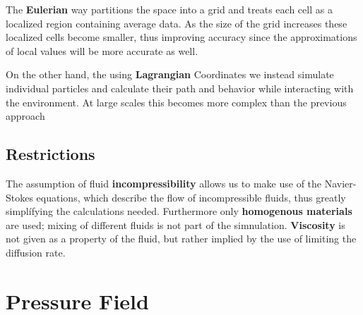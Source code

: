 \documentclass[12pt, titlepage]{article}
\begin{document}
\begin{figure}[b]
\centering
\begin{minipage}{.5\textwidth}
  \centering
  \label{fig:test1}
\end{minipage}%
\begin{minipage}{.5\textwidth}
  \centering
  \label{fig:test2}
\end{minipage}
\end{figure}


The \textbf{Eulerian} way partitions the space into a grid and treats each cell as a localized region containing average data. As the size of the grid increases these localized cells become smaller, thus improving accuracy since the approximations of local values will be more accurate as well.

On the other hand, the using \textbf{Lagrangian} Coordinates we instead simulate individual particles and calculate their path and behavior while interacting with the environment.
At large scales this becomes more complex than the previous approach

\subsection{Restrictions}
The assumption of fluid \textbf{incompressibility} allows us to make use of the Navier-Stokes equations, which describe the flow of incompressible fluids, thus greatly simplífying the calculations needed.
Furthermore only \textbf{homogenous materials} are used; mixing of different fluids is not part of the simnulation.
\textbf{Viscosity} is not given as a property of the fluid, but rather implied by the use of limiting the diffusion rate.


\section{Pressure Field}
\end{document}
